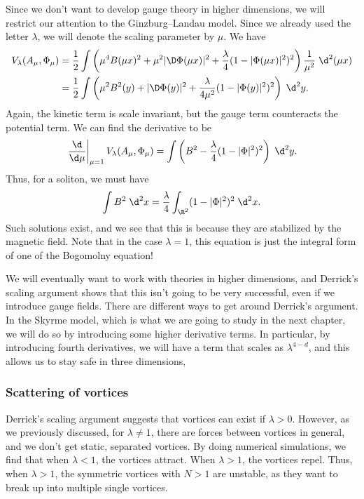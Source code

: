 \documentclass[a4paper]{article}
\begin{document}
Since we don't want to develop gauge theory in higher dimensions, we will restrict our attention to the Ginzburg--Landau model. Since we already used the letter $\lambda$, we will denote the scaling parameter by $\mu$. We have
\begin{align*}
  V_\lambda(A_\mu, \Phi_\mu) &= \frac{1}{2} \int \left(\mu^4 B(\mu x)^2 + \mu^2 |\D \Phi(\mu x)|^2 + \frac{\lambda}{4} (1 - |\Phi(\mu x)|^2)^2\right) \frac{1}{\mu^2}\;\d^2 (\mu x)\\
  &= \frac{1}{2} \int \left(\mu^2 B^2(y) + |\D \Phi(y)|^2 + \frac{\lambda}{4 \mu^2} (1 - |\Phi(y)|^2)^2\right)\;\d^2 y.
\end{align*}
Again, the kinetic term is scale invariant, but the gauge term counteracts the potential term. We can find the derivative to be
\[
  \left.\frac{\d}{\d \mu}\right|_{\mu = 1} V_\lambda(A_\mu, \Phi_\mu) = \int \left(B^2 - \frac{\lambda}{4}(1 - |\Phi|^2)^2\right)\;\d^2 y.
\]
Thus, for a soliton, we must have
\[
  \int B^2\;\d^2 x = \frac{\lambda}{4} \int_{\R^2} (1 - |\Phi|^2)^2 \;\d^2 x.
\]
Such solutions exist, and we see that this is because they are stabilized by the magnetic field. Note that in the case $\lambda = 1$, this equation is just the integral form of one of the Bogomolny equation!

We will eventually want to work with theories in higher dimensions, and Derrick's scaling argument shows that this isn't going to be very successful, even if we introduce gauge fields. There are different ways to get around Derrick's argument. In the Skyrme model, which is what we are going to study in the next chapter, we will do so by introducing some higher derivative terms. In particular, by introducing fourth derivatives, we will have a term that scales as $\lambda^{4 - d}$, and this allows us to stay safe in three dimensions,

\subsubsection*{Scattering of vortices}
Derrick's scaling argument suggests that vortices can exist if $\lambda > 0$. However, as we previously discussed, for $\lambda \not= 1$, there are forces between vortices in general, and we don't get static, separated vortices. By doing numerical simulations, we find that when $\lambda < 1$, the vortices attract. When $\lambda > 1$, the vortices repel. Thus, when $\lambda > 1$, the symmetric vortices with $N > 1$ are unstable, as they want to break up into multiple single vortices.
\end{document}
